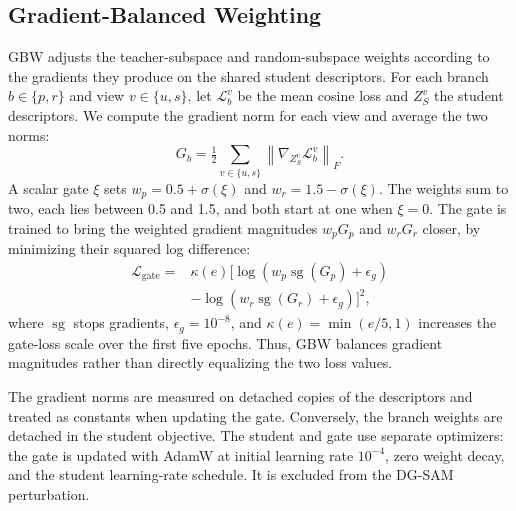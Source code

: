 \subsection{Gradient-Balanced Weighting}
\label{sec:supp-balancing}
GBW adjusts the teacher-subspace and random-subspace weights according to the gradients they produce on the shared student descriptors. For each branch $b\in\{p,r\}$ and view $v\in\{u,s\}$, let $\mathcal L_b^v$ be the mean cosine loss and $Z_S^v$ the student descriptors. We compute the gradient norm for each view and average the two norms:
\begin{equation}
G_b=\tfrac12\!\sum_{v\in\{u,s\}}\left\|\nabla_{Z_S^v}\mathcal L_b^v\right\|_F.
\end{equation}
A scalar gate $\xi$ sets $w_p=0.5+\sigma(\xi)$ and $w_r=1.5-\sigma(\xi)$. The weights sum to two, each lies between 0.5 and 1.5, and both start at one when $\xi=0$. The gate is trained to bring the weighted gradient magnitudes $w_pG_p$ and $w_rG_r$ closer, by minimizing their squared log difference:
\begin{equation}
\begin{aligned}
\mathcal L_{\mathrm{gate}}={}&\kappa(e)\big[\log(w_p\operatorname{sg}(G_p)+\epsilon_g)\\
&-\log(w_r\operatorname{sg}(G_r)+\epsilon_g)\big]^2,
\end{aligned}
\end{equation}
where $\operatorname{sg}$ stops gradients, $\epsilon_g=10^{-8}$, and $\kappa(e)=\min(e/5,1)$ increases the gate-loss scale over the first five epochs. Thus, GBW balances gradient magnitudes rather than directly equalizing the two loss values.

The gradient norms are measured on detached copies of the descriptors and treated as constants when updating the gate. Conversely, the branch weights are detached in the student objective. The student and gate use separate optimizers: the gate is updated with AdamW at initial learning rate $10^{-4}$, zero weight decay, and the student learning-rate schedule. It is excluded from the DG-SAM perturbation.

